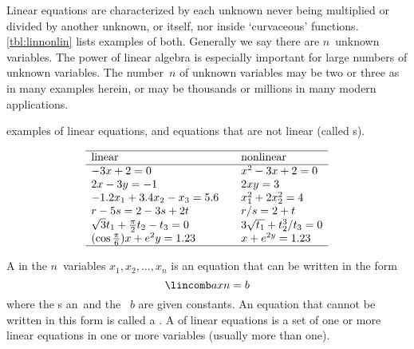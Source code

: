Linear equations are characterized by each unknown never being multiplied or divided by another unknown, or itself, nor inside `curvaceous' functions.  
\autoref{tbl:linnonlin} lists examples of both.
Generally we say there are \(n\)~unknown variables.
The power of linear algebra is especially important for large numbers of unknown variables.
The number~\(n\) of unknown variables may be two or three as in many examples herein, or may be thousands or millions in many modern applications.
\begin{table}
\caption{examples of linear equations, and equations that are not linear (called s).}
\label{tbl:linnonlin}
\begin{equation*}
\begin{array}{l@{\qquad}l}\hline
\text{linear}&\text{nonlinear}\\\hline
-3x+2=0 & x^2-3x+2=0 \\
2x-3y=-1 & 2xy=3\\
-1.2x_1+3.4x_2-x_3=5.6 & x_1^2+2x_2^2=4 \\
r-5s=2-3s+2t & r/s=2+t \\
\sqrt3t_1+\frac\pi2t_2-t_3=0 & 3\sqrt{t_1}+t_2^3/t_3=0\\
(\cos\frac\pi6)x+e^2y=1.23 & x+e^{2y}=1.23\\
\hline
\end{array}
\end{equation*}
\end{table}




\begin{definition} \label{def:lineqn} 
A  in the \(n\)~variables \(x_1,x_2,\ldots,x_n\) is an equation that can be written in the form
\begin{equation*}
\lincomb axn=b
\end{equation*}
where the s \hlist an\ and the ~\(b\) are given  constants.
An equation that cannot be written in this form is called a .
A  of linear equations is a set of one or more linear equations in one or more variables (usually more than one).
\end{definition}


